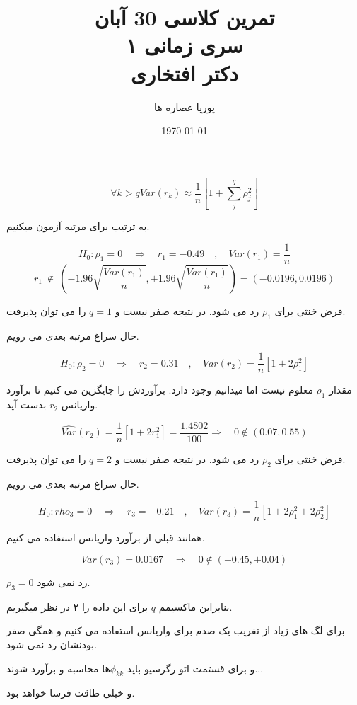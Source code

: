 \documentclass[a5paper,10pt]{article}
\author{پوریا عصاره ها}
\title{
    تمرین کلاسی 30 آبان\\
    سری زمانی ۱ \\
    دکتر افتخاری
}
\date{\today}
\begin{document}
\maketitle
\[ \forall k > q  Var(r_k) \approx \frac{1}{n} \left[ 1 + \sum_j^q \rho^2_j \right] \]

به ترتیب برای مرتبه  آزمون میکنیم.


\[ H_0: \rho_1 = 0 \quad \Rightarrow \quad r_1 = -0.49 \quad , \quad Var(r_1) = \frac{1}{n} \] 
\[ r_1 \ \notin \ (- 1.96\sqrt{\frac{Var(r_1)}{n}}, +1.96\sqrt{\frac{Var(r_1)}{n}}) = (-0.0196, 0.0196) \]

فرض خنثی برای $\rho_1$ رد می شود. در نتیجه صفر نیست و $q=1$ را می توان پذیرفت.

حال سراغ مرتبه بعدی می رویم.

\[ H_0: \rho_2 = 0 \quad \Rightarrow \quad r_2 = 0.31 \quad , \quad Var(r_2) = \frac{1}{n}\left[1 + 2\rho_1^2\right] \] 

مقدار $\rho_1$ معلوم نیست اما میدانیم وجود دارد. برآوردش را جایگزین می کنیم تا برآورد واریانس $r_2$ بدست آید.

\[ \hat{Var}(r_2) = \frac{1}{n}\left[1 + 2r_1^2 \right] = \frac{1.4802}{100} \Rightarrow \quad 0 \notin ( 0.07 , 0.55) \]

فرض خنثی برای $\rho_2$ رد می شود. در نتیجه صفر نیست و $q=2$ را می توان پذیرفت.

حال سراغ مرتبه بعدی می رویم.

\[H_0: rho_3 = 0 \quad \Rightarrow \quad r_3 = - 0.21 \quad , \quad Var(r_3) = \frac{1}{n}\left[1 + 2\rho_1^2 + 2\rho_2^2\right] \]

همانند قبلی از برآورد واریانس استفاده می کنیم.

\[ Var(r_3) =  0.0167 \quad \Rightarrow \quad 0 \notin (- 0.45, + 0.04) \]

$\rho_3 = 0$ رد نمی شود. 

بنابراین ماکسیمم $q$ برای این داده را ۲ در نظر میگیریم. 


برای لگ های زیاد از تقریب یک صدم برای واریانس استفاده می کنیم و همگی صفر بودنشان رد نمی شود. 

و برای قستمت اتو رگرسیو باید $\phi_{kk}$ها محاسبه و برآورد شوند... 

و خیلی طاقت فرسا خواهد بود.
\end{document}
